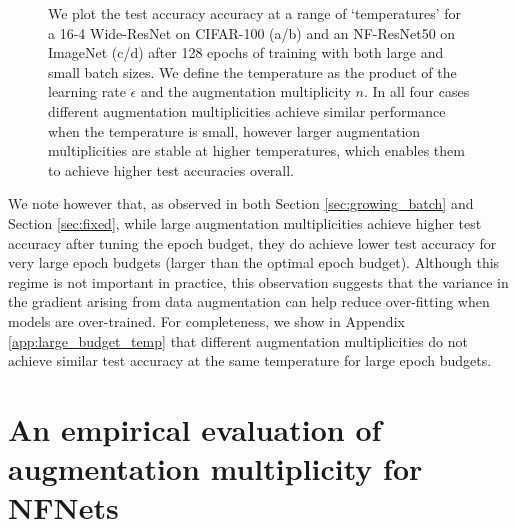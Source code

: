 \documentclass{article}
\begin{document}
\begin{figure}[t]
\centering
\vskip -3mm
 \vskip -2mm
\caption{We plot the test accuracy accuracy at a range of `temperatures' for a 16-4 Wide-ResNet on CIFAR-100 (a/b) and an NF-ResNet50 on ImageNet (c/d) after 128 epochs of training with both large and small batch sizes. We define the temperature as the product of the learning rate $\epsilon$ and the augmentation multiplicity $n$. In all four cases different augmentation multiplicities achieve similar performance when the temperature is small, however larger augmentation multiplicities are stable at higher temperatures, which enables them to achieve higher test accuracies overall.
}
 \vskip -3mm
\label{fig:temperature_main}
\end{figure}





We note however that, as observed in both Section \ref{sec:growing_batch} and Section \ref{sec:fixed}, while large augmentation multiplicities achieve higher test accuracy after tuning the epoch budget, they do achieve lower test accuracy for very large epoch budgets (larger than the optimal epoch budget). Although this regime is not important in practice, this observation suggests that the variance in the gradient arising from data augmentation can help reduce over-fitting when models are over-trained. For completeness, we show in Appendix \ref{app:large_budget_temp} that different augmentation multiplicities do not achieve similar test accuracy at the same temperature for large epoch budgets.






\section{An empirical evaluation of augmentation multiplicity for NFNets}
\end{document}
